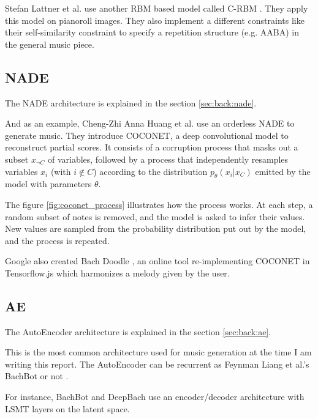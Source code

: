 \documentclass[12pt]{report}
\begin{document}
Stefan Lattner et al. \cite{lattner_imposing_2018} use another RBM based model called C-RBM \cite{norouzi_convolutional_nodate, norouzi_stacks_nodate}.
They apply this model on pianoroll images.
They also implement a different constraints like their self-similarity constraint to specify a repetition structure (e.g. AABA) in the general music piece.


\subsection{NADE}
\label{sec:rw:nade}

The NADE architecture is explained in the section \ref{sec:back:nade}.

And as an example, Cheng-Zhi Anna Huang et al. \cite{huang_counterpoint_2017} use an orderless NADE \cite{uria_deep_2014} to generate music. They introduce COCONET, a deep convolutional model to reconstruct partial scores.
It consists of a corruption process that masks out a subset $x_{\neg C}$ of variables, followed by a process that independently resamples variables $x_{i}$ (with $i \not \in C$) according to the distribution $p_{\theta} (x_i | x_C )$ emitted by the model with parameters $\theta$.


The figure \ref{fig:coconet_process} illustrates how the process works.
At each step, a random subset of notes is removed, and the model is asked to infer their values.
New values are sampled from the probability distribution put out by the model, and the process is repeated.

Google also created Bach Doodle \cite{huang_bach_2019}, an online tool re-implementing COCONET in Tensorflow.js \cite{noauthor_tensorflowjs_nodate} which harmonizes a melody given by the user.


\subsection{AE}

The AutoEncoder architecture is explained in the section \ref{sec:back:ae}.

This is the most common architecture used for music generation at the time I am writing this report.
The AutoEncoder can be recurrent  \cite{liang_automatic_2017, chuan_modeling_nodate, hadjeres_deepbach:_2016, kalchbrenner_efficient_2018, mehri_samplernn_2017} as Feynman Liang et al.'s BachBot \cite{liang_automatic_2017} or not \cite{dieleman_challenge_2018}.

For instance, BachBot \cite{liang_automatic_2017} and DeepBach \cite{hadjeres_deepbach:_2016} use an encoder/decoder architecture with LSMT layers on the latent space. \cite{chuan_modeling_nodate}
\end{document}
